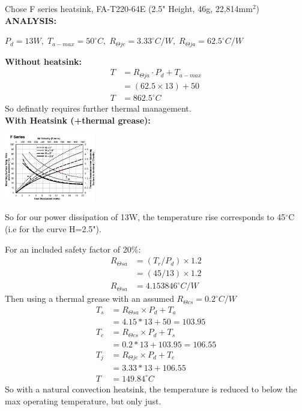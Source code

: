\documentclass[11pt]{article}
\begin{document}
\begin{preview}
\begin{enumerate}[label=\alph*)]
          Chose F series heatsink, FA-T220-64E (2.5" Height, 46g, 22,814mm$^2$) \\

          \textbf{ANALYSIS:}

          $P_d = 13W, \; T_{a-max} = 50^{\circ}C, \; R_{\Theta jc} = 3.33^{\circ}C/W, \; R_{\Theta ja} = 62.5^{\circ}C/W$ 

          \textbf{Without heatsink:}
          \begin{align*}
          T &= R_{\Theta ja} {\cdot} P_d + T_{a-max} \\
          &= (62.5 \times 13)+50 \\
          T &= 862.5^{\circ}C
          \end{align*}
          So definatly requires further thermal management. \\

          \textbf{With Heatsink (+thermal grease):}

          \begin{center}
            \includegraphics[width=0.3\textwidth]{F_series_heatsink_natural.png}
          \end{center}

          So for our power dissipation of 13W, the temperature rise corresponds to 45$^\circ$C (i.e for the curve H=2.5").

          For an included safety factor of 20\%:
          \begin{align*}
            R_{\Theta sa} &= (T_{r} / P_{d}) \times 1.2 \\
            &= (45/13) \times 1.2\\
            R_{\Theta sa} &=4.153846^{\circ}C/W
          \end{align*}
          Then using a thermal grease with an assumed $R_{\Theta cs} = 0.2^{\circ}C/W$
          \begin{align*}
            T_{s} &= R_{\Theta sa} \times P_{d} + T_{a}\\
                  &= 4.15*13+50=103.95 \\
            T_{c} &= R_{\Theta cs} \times P_{d} + T_{s} \\
                  &= 0.2*13+103.95=106.55 \\
            T_{j} &= R_{\Theta jc} \times P_{d} + T_{c} \\
                  &= 3.33*13+106.55 \\ 
            T     &= 149.84^{\circ}C
          \end{align*}
          So with a natural convection heatsink, the temperature is reduced to below the max operating temperature, but only just.


\end{enumerate}
\end{preview}
\end{document}

